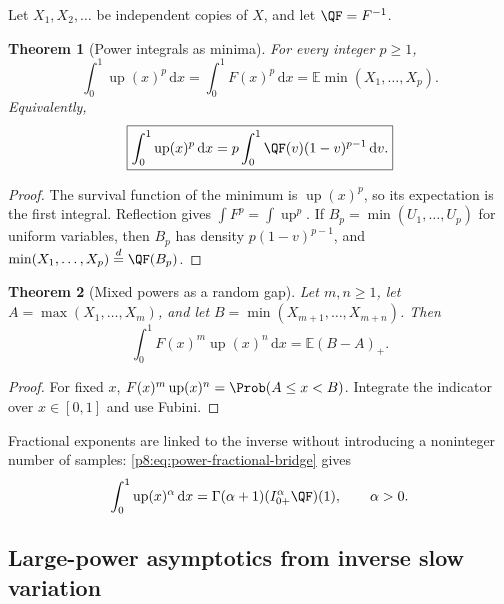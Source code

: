 \documentclass[11pt,oneside]{article}
\newtheorem{theorem}{Theorem}[section]
\theoremstyle{definition}
\theoremstyle{remark}
\newcommand{\Up}{\operatorname{up}}
\newcommand{\E}{\mathbb E}
\newcommand{\dd}{\,\mathrm d}
\newcommand{\1}{\mathbf 1}
\begin{document}
Let \(X_1,X_2,\ldots\) be independent copies of \(X\), and let
\(\QF=F^{-1}\).

\begin{theorem}[Power integrals as minima]
\label{p8:thm:power-minimum}
For every integer \(p\ge1\),
\begin{equation}
 \boxed{
 \int_0^1\Up(x)^p\dd x
 =\int_0^1F(x)^p\dd x
 =\E\min(X_1,\ldots,X_p).}
 \label{p8:eq:power-minimum}
\end{equation}
Equivalently,
\begin{equation}
 \boxed{
 \int_0^1\Up(x)^p\dd x
 =p\int_0^1\QF(v)(1-v)^{p-1}\dd v.}
 \label{p8:eq:power-beta-quantile}
\end{equation}
\statusprovedPartll
\end{theorem}

\begin{proof}
The survival function of the minimum is \(\Up(x)^p\), so its expectation is the
first integral.  Reflection gives \(\int F^p=\int\Up^p\).  If
\(B_p=\min(U_1,\ldots,U_p)\) for uniform variables, then
\(B_p\) has density \(p(1-v)^{p-1}\), and
\(\min(X_1,\ldots,X_p)\stackrel d=\QF(B_p)\).
\end{proof}

\begin{theorem}[Mixed powers as a random gap]
\label{p8:thm:mixed-powers-gap}
Let \(m,n\ge1\), let
\(A=\max(X_1,\ldots,X_m)\), and let
\(B=\min(X_{m+1},\ldots,X_{m+n})\).  Then
\begin{equation}
 \boxed{
 \int_0^1F(x)^m\Up(x)^n\dd x=\E(B-A)_+.}
 \label{p8:eq:mixed-gap}
\end{equation}
\statusprovedPartll
\end{theorem}

\begin{proof}
For fixed \(x\), \(F(x)^m\Up(x)^n=\Prob(A\le x<B)\).  Integrate the indicator
over \(x\in[0,1]\) and use Fubini.
\end{proof}

Fractional exponents are linked to the inverse without introducing a
noninteger number of samples: \eqref{p8:eq:power-fractional-bridge} gives
\begin{equation}
 \int_0^1\Up(x)^\alpha\dd x
 =\Gamma(\alpha+1)(I_{0+}^{\alpha}\QF)(1),
 \qquad \alpha>0.
 \label{p8:eq:power-alpha-Q}
\end{equation}

\subsection{Large-power asymptotics from inverse slow variation}
\end{document}
